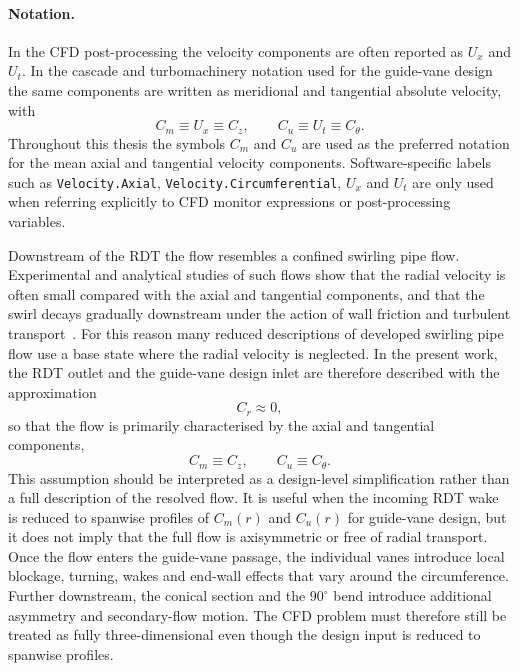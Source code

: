 \paragraph{Notation.}
In the CFD post-processing the velocity components are often reported as $U_x$ and $U_t$. In the cascade and turbomachinery notation used for the guide-vane design the same components are written as meridional and tangential absolute velocity, with
\begin{equation}
C_m \equiv U_x \equiv C_z,
\qquad
C_u \equiv U_t \equiv C_\theta.
\label{eq:notation_equivalence}
\end{equation}
Throughout this thesis the symbols $C_m$ and $C_u$ are used as the preferred notation for the mean axial and tangential velocity components. Software-specific labels such as \texttt{Velocity.Axial}, \texttt{Velocity.Circumferential}, $U_x$ and $U_t$ are only used when referring explicitly to CFD monitor expressions or post-processing variables.

Downstream of the RDT the flow resembles a confined swirling pipe flow. Experimental and analytical studies of such flows show that the radial velocity is often small compared with the axial and tangential components, and that the swirl decays gradually downstream under the action of wall friction and turbulent transport~\cite{Kitoh1991}. For this reason many reduced descriptions of developed swirling pipe flow use a base state where the radial velocity is neglected. In the present work, the RDT outlet and the guide-vane design inlet are therefore described with the approximation
\begin{equation}
C_r \approx 0,
\label{eq:Cr_zero}
\end{equation}
so that the flow is primarily characterised by the axial and tangential components,
\begin{equation}
C_m \equiv C_z, \qquad C_u \equiv C_\theta.
\label{eq:Cm_Cu_def}
\end{equation}
This assumption should be interpreted as a design-level simplification rather than a full description of the resolved flow. It is useful when the incoming RDT wake is reduced to spanwise profiles of $C_m(r)$ and $C_u(r)$ for guide-vane design, but it does not imply that the full flow is axisymmetric or free of radial transport. Once the flow enters the guide-vane passage, the individual vanes introduce local blockage, turning, wakes and end-wall effects that vary around the circumference. Further downstream, the conical section and the $90^\circ$ bend introduce additional asymmetry and secondary-flow motion. The CFD problem must therefore still be treated as fully three-dimensional even though the design input is reduced to spanwise profiles.

